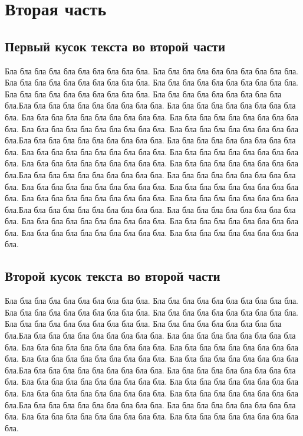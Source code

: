 \documentclass[12pt, a4paper]{article}
\begin{document}
\newpage

\section{Вторая часть}
\subsection{Первый кусок текста во второй части}


Бла бла бла бла бла бла бла бла бла бла. Бла бла бла бла бла бла бла бла бла бла. Бла бла бла бла бла бла бла бла бла бла. Бла бла бла бла бла бла бла бла бла бла. Бла бла бла бла бла бла бла бла бла бла. Бла бла бла бла бла бла бла бла бла бла.Бла бла бла бла бла бла бла бла бла бла. Бла бла бла бла бла бла бла бла бла бла. Бла бла бла бла бла бла бла бла бла бла. Бла бла бла бла бла бла бла бла бла бла. Бла бла бла бла бла бла бла бла бла бла. Бла бла бла бла бла бла бла бла бла бла.Бла бла бла бла бла бла бла бла бла бла. Бла бла бла бла бла бла бла бла бла бла. Бла бла бла бла бла бла бла бла бла бла. Бла бла бла бла бла бла бла бла бла бла. Бла бла бла бла бла бла бла бла бла бла. Бла бла бла бла бла бла бла бла бла бла.Бла бла бла бла бла бла бла бла бла бла. Бла бла бла бла бла бла бла бла бла бла. Бла бла бла бла бла бла бла бла бла бла. Бла бла бла бла бла бла бла бла бла бла. Бла бла бла бла бла бла бла бла бла бла. Бла бла бла бла бла бла бла бла бла бла.Бла бла бла бла бла бла бла бла бла бла. Бла бла бла бла бла бла бла бла бла бла. Бла бла бла бла бла бла бла бла бла бла. Бла бла бла бла бла бла бла бла бла бла. Бла бла бла бла бла бла бла бла бла бла. Бла бла бла бла бла бла бла бла бла бла.

\subsection{Второй кусок текста во второй части}
Бла бла бла бла бла бла бла бла бла бла. Бла бла бла бла бла бла бла бла бла бла. Бла бла бла бла бла бла бла бла бла бла. Бла бла бла бла бла бла бла бла бла бла. Бла бла бла бла бла бла бла бла бла бла. Бла бла бла бла бла бла бла бла бла бла.Бла бла бла бла бла бла бла бла бла бла. Бла бла бла бла бла бла бла бла бла бла. Бла бла бла бла бла бла бла бла бла бла. Бла бла бла бла бла бла бла бла бла бла. Бла бла бла бла бла бла бла бла бла бла. Бла бла бла бла бла бла бла бла бла бла.Бла бла бла бла бла бла бла бла бла бла. Бла бла бла бла бла бла бла бла бла бла. Бла бла бла бла бла бла бла бла бла бла. Бла бла бла бла бла бла бла бла бла бла. Бла бла бла бла бла бла бла бла бла бла. Бла бла бла бла бла бла бла бла бла бла.Бла бла бла бла бла бла бла бла бла бла. Бла бла бла бла бла бла бла бла бла бла. Бла бла бла бла бла бла бла бла бла бла. Бла бла бла бла бла бла бла бла бла бла.
\end{document}
